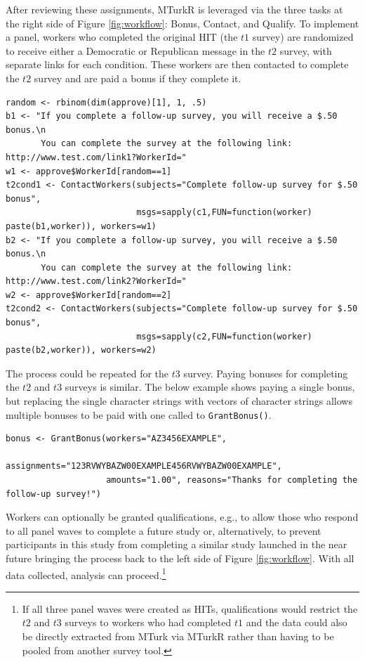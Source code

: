\documentclass[11pt]{article}
\begin{document}
After reviewing these assignments, MTurkR is leveraged via the three tasks at the right side of Figure \ref{fig:workflow}: Bonus, Contact, and Qualify. To implement a panel, workers who completed the original HIT (the $t1$ survey) are randomized to receive either a Democratic or Republican message in the $t2$ survey, with separate links for each condition. These workers are then contacted to complete the $t2$ survey and are paid a bonus if they complete it.

\begin{Verbatim}[fontsize=\footnotesize, xleftmargin=3mm]
random <- rbinom(dim(approve)[1], 1, .5)
b1 <- "If you complete a follow-up survey, you will receive a $.50 bonus.\n
       You can complete the survey at the following link: http://www.test.com/link1?WorkerId="
w1 <- approve$WorkerId[random==1]
t2cond1 <- ContactWorkers(subjects="Complete follow-up survey for $.50 bonus",
                          msgs=sapply(c1,FUN=function(worker) paste(b1,worker)), workers=w1)
b2 <- "If you complete a follow-up survey, you will receive a $.50 bonus.\n
       You can complete the survey at the following link: http://www.test.com/link2?WorkerId="
w2 <- approve$WorkerId[random==2]
t2cond2 <- ContactWorkers(subjects="Complete follow-up survey for $.50 bonus",
                          msgs=sapply(c2,FUN=function(worker) paste(b2,worker)), workers=w2)
\end{Verbatim}

The process could be repeated for the $t3$ survey. Paying bonuses for completing the $t2$ and $t3$ surveys is similar. The below example shows paying a single bonus, but replacing the single character strings with vectors of character strings allows multiple bonuses to be paid with one called to \verb|GrantBonus()|.

\begin{Verbatim}[fontsize=\footnotesize, xleftmargin=3mm]
bonus <- GrantBonus(workers="AZ3456EXAMPLE",
                    assignments="123RVWYBAZW00EXAMPLE456RVWYBAZW00EXAMPLE",
                    amounts="1.00", reasons="Thanks for completing the follow-up survey!")
\end{Verbatim}

\noindent Workers can optionally be granted qualifications, e.g., to allow those who respond to all panel waves to complete a future study or, alternatively, to prevent participants in this study from completing a similar study launched in the near future bringing the process back to the left side of Figure \ref{fig:workflow}. With all data collected, analysis can proceed.\footnote{If all three panel waves were created as HITs, qualifications would restrict the $t2$ and $t3$ surveys to workers who had completed $t1$ and the data could also be directly extracted from MTurk via MTurkR rather than having to be pooled from another survey tool.}
\end{document}

